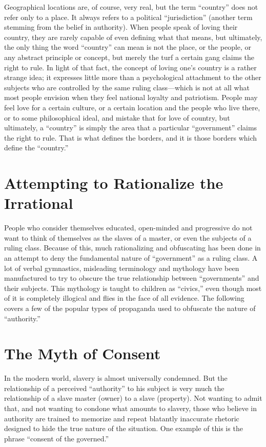 \documentclass{book}
\begin{document}
Geographical locations are, of course, very real, but the term \enquote{country} does not refer only to a place. It always refers to a political \enquote{jurisdiction} (another term stemming from the belief in authority). When people speak of loving their country, they are rarely capable of even defining what that means, but ultimately, the only thing the word \enquote{country} can mean is not the place, or the people, or any abstract principle or concept, but merely the turf a certain gang claims the right to rule. In light of that fact, the concept of loving one's country is a rather strange idea; it expresses little more than a psychological attachment to the other subjects who are controlled by the same ruling class---which is not at all what most people envision when they feel national loyalty and patriotism. People may feel love for a certain culture, or a certain location and the people who live there, or to some philosophical ideal, and mistake that for love of country, but ultimately, a \enquote{country} is simply the area that a particular \enquote{government} claims the right to rule. That is what defines the borders, and it is those borders which define the \enquote{country.}

\section{Attempting to Rationalize the Irrational}

People who consider themselves educated, open-minded and progressive do not want to think of themselves as the slaves of a master, or even the subjects of a ruling class. Because of this, much rationalizing and obfuscating has been done in an attempt to deny the fundamental nature of \enquote{government} as a ruling class. A lot of verbal gymnastics, misleading terminology and mythology have been manufactured to try to obscure the true relationship between \enquote{governments} and their subjects. This mythology is taught to children as \enquote{civics,} even though most of it is completely illogical and flies in the face of all evidence. The following covers a few of the popular types of propaganda used to obfuscate the nature of \enquote{authority.}

\section{The Myth of Consent}

In the modern world, slavery is almost universally condemned. But the relationship of a perceived \enquote{authority} to his subject is very much the relationship of a slave master (owner) to a slave (property). Not wanting to admit that, and not wanting to condone what amounts to slavery, those who believe in authority are trained to memorize and repeat blatantly inaccurate rhetoric designed to hide the true nature of the situation. One example of this is the phrase \enquote{consent of the governed.}
\end{document}
